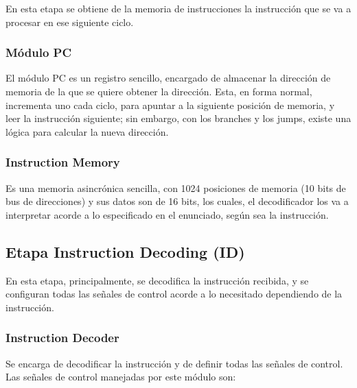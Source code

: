 En esta etapa se obtiene de la memoria de instrucciones la instrucción que se va a procesar en ese siguiente ciclo.

\subsubsection{Módulo PC}

El módulo PC es un registro sencillo, encargado de almacenar la dirección de memoria de la que se quiere obtener la dirección. Esta, en forma normal, incrementa uno cada ciclo, para apuntar a la siguiente posición de memoria, y leer la instrucción siguiente; sin embargo, con los branches y los jumps, existe una lógica para calcular la nueva dirección.

\subsubsection{Instruction Memory}

Es una memoria asincrónica sencilla, con 1024 posiciones de memoria (10 bits de bus de direcciones) y sus datos son de 16 bits, los cuales, el decodificador los va a interpretar acorde a lo especificado en el enunciado, según sea la instrucción.

\subsection{Etapa Instruction Decoding (ID)}

En esta etapa, principalmente, se decodifica la instrucción recibida, y se configuran todas las señales de control acorde a lo necesitado dependiendo de la instrucción. 

\subsubsection{Instruction Decoder}

Se encarga de decodificar la instrucción y de definir todas las señales de control. Las señales de control manejadas por este módulo son:

